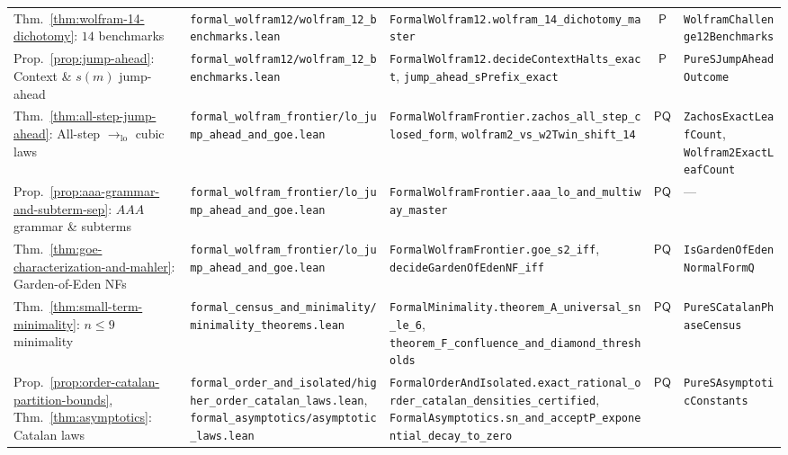 \documentclass[11pt,reqno]{amsart}
\numberwithin{equation}{section}
\theoremstyle{plain}
\theoremstyle{definition}
\theoremstyle{remark}
\begin{document}
\begin{table}[htbp]
\begin{tabular}{@{}lllcl@{}}
Thm.~\ref{thm:wolfram-14-dichotomy}: $14$ benchmarks & \texttt{formal\_wolfram12/wolfram\_12\_benchmarks.lean} & \texttt{FormalWolfram12.wolfram\_14\_dichotomy\_master} & $\mathsf{P}$ & \texttt{WolframChallenge12Benchmarks} \\
Prop.~\ref{prop:jump-ahead}: Context \& $s(m)$ jump-ahead & \texttt{formal\_wolfram12/wolfram\_12\_benchmarks.lean} & \texttt{FormalWolfram12.decideContextHalts\_exact}, \texttt{jump\_ahead\_sPrefix\_exact} & $\mathsf{P}$ & \texttt{PureSJumpAheadOutcome} \\
Thm.~\ref{thm:all-step-jump-ahead}: All-step $\to_{\mathrm{lo}}$ cubic laws & \texttt{formal\_wolfram\_frontier/lo\_jump\_ahead\_and\_goe.lean} & \texttt{FormalWolframFrontier.zachos\_all\_step\_closed\_form}, \texttt{wolfram2\_vs\_w2Twin\_shift\_14} & $\mathsf{PQ}$ & \texttt{ZachosExactLeafCount}, \texttt{Wolfram2ExactLeafCount} \\
Prop.~\ref{prop:aaa-grammar-and-subterm-sep}: $A A A$ grammar \& subterms & \texttt{formal\_wolfram\_frontier/lo\_jump\_ahead\_and\_goe.lean} & \texttt{FormalWolframFrontier.aaa\_lo\_and\_multiway\_master} & $\mathsf{PQ}$ & --- \\
Thm.~\ref{thm:goe-characterization-and-mahler}: Garden-of-Eden NFs & \texttt{formal\_wolfram\_frontier/lo\_jump\_ahead\_and\_goe.lean} & \texttt{FormalWolframFrontier.goe\_s2\_iff}, \texttt{decideGardenOfEdenNF\_iff} & $\mathsf{PQ}$ & \texttt{IsGardenOfEdenNormalFormQ} \\
Thm.~\ref{thm:small-term-minimality}: $n \le 9$ minimality & \texttt{formal\_census\_and\_minimality/minimality\_theorems.lean} & \texttt{FormalMinimality.theorem\_A\_universal\_sn\_le\_6}, \texttt{theorem\_F\_confluence\_and\_diamond\_thresholds} & $\mathsf{PQ}$ & \texttt{PureSCatalanPhaseCensus} \\
Prop.~\ref{prop:order-catalan-partition-bounds}, Thm.~\ref{thm:asymptotics}: Catalan laws & \texttt{formal\_order\_and\_isolated/higher\_order\_catalan\_laws.lean}, \texttt{formal\_asymptotics/asymptotic\_laws.lean} & \texttt{FormalOrderAndIsolated.exact\_rational\_order\_catalan\_densities\_certified}, \texttt{FormalAsymptotics.sn\_and\_acceptP\_exponential\_decay\_to\_zero} & $\mathsf{PQ}$ & \texttt{PureSAsymptoticConstants} \\
\bottomrule
\end{tabular}
\end{table}
\end{document}
